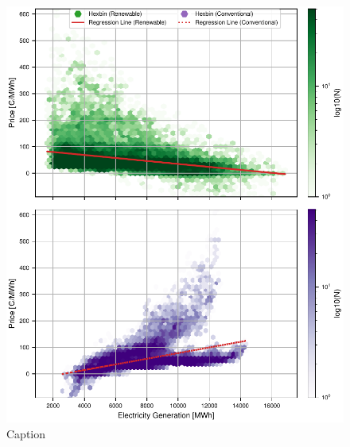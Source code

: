 \documentclass{article}
\begin{document}


\begin{figure}[h]
    \centering
    \includegraphics[width=0.85\columnwidth]{doc/fig/ren_vs_con_regression_separate.pdf}
    \caption{Caption}
    \label{fig:ren_vs_con_regression}
\end{figure}
\end{document}
